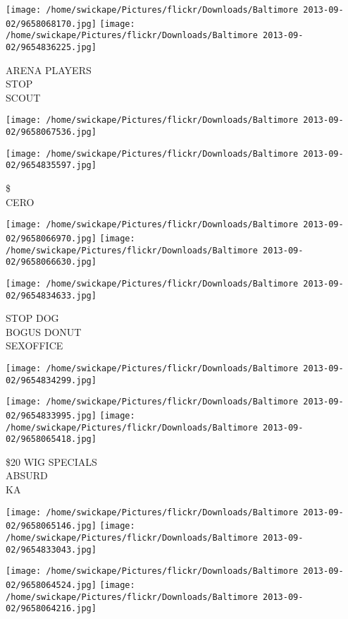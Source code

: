 \documentclass[10pt,letterpaper]{article}
\begin{document}
\vspace{0.25in}
\texttt{[image: /home/swickape/Pictures/flickr/Downloads/Baltimore 2013-09-02/9658068170.jpg]}
\texttt{[image: /home/swickape/Pictures/flickr/Downloads/Baltimore 2013-09-02/9654836225.jpg]}

ARENA PLAYERS\\
STOP\\
SCOUT
\pagebreak

\texttt{[image: /home/swickape/Pictures/flickr/Downloads/Baltimore 2013-09-02/9658067536.jpg]}

\vspace{0.25in}
\texttt{[image: /home/swickape/Pictures/flickr/Downloads/Baltimore 2013-09-02/9654835597.jpg]}

\$\\
CERO
\pagebreak

\texttt{[image: /home/swickape/Pictures/flickr/Downloads/Baltimore 2013-09-02/9658066970.jpg]}
\texttt{[image: /home/swickape/Pictures/flickr/Downloads/Baltimore 2013-09-02/9658066630.jpg]}

\texttt{[image: /home/swickape/Pictures/flickr/Downloads/Baltimore 2013-09-02/9654834633.jpg]}

STOP DOG\\
BOGUS DONUT\\
SEXOFFICE
\pagebreak

\texttt{[image: /home/swickape/Pictures/flickr/Downloads/Baltimore 2013-09-02/9654834299.jpg]}

\vspace{0.25in}
\texttt{[image: /home/swickape/Pictures/flickr/Downloads/Baltimore 2013-09-02/9654833995.jpg]}
\texttt{[image: /home/swickape/Pictures/flickr/Downloads/Baltimore 2013-09-02/9658065418.jpg]}

\$20 WIG SPECIALS\\
ABSURD\\
KA
\pagebreak

\texttt{[image: /home/swickape/Pictures/flickr/Downloads/Baltimore 2013-09-02/9658065146.jpg]}
\texttt{[image: /home/swickape/Pictures/flickr/Downloads/Baltimore 2013-09-02/9654833043.jpg]}

\texttt{[image: /home/swickape/Pictures/flickr/Downloads/Baltimore 2013-09-02/9658064524.jpg]}
\texttt{[image: /home/swickape/Pictures/flickr/Downloads/Baltimore 2013-09-02/9658064216.jpg]}
\end{document}
